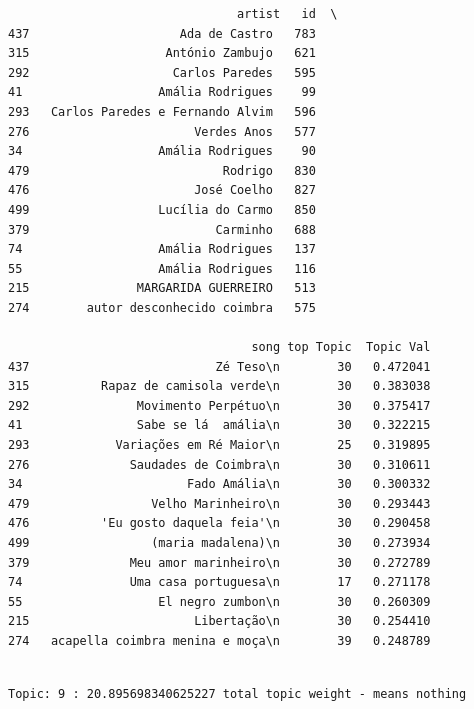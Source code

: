 \documentclass[11pt]{article}
\begin{document}
    
    \begin{verbatim}
                                artist   id  \
437                     Ada de Castro   783   
315                   António Zambujo   621   
292                    Carlos Paredes   595   
41                   Amália Rodrigues    99   
293   Carlos Paredes e Fernando Alvim   596   
276                       Verdes Anos   577   
34                   Amália Rodrigues    90   
479                           Rodrigo   830   
476                       José Coelho   827   
499                  Lucília do Carmo   850   
379                          Carminho   688   
74                   Amália Rodrigues   137   
55                   Amália Rodrigues   116   
215               MARGARIDA GUERREIRO   513   
274        autor desconhecido coimbra   575   

                                  song top Topic  Topic Val  
437                          Zé Teso\n        30   0.472041  
315          Rapaz de camisola verde\n        30   0.383038  
292               Movimento Perpétuo\n        30   0.375417  
41                Sabe se lá  amália\n        30   0.322215  
293            Variações em Ré Maior\n        25   0.319895  
276              Saudades de Coimbra\n        30   0.310611  
34                       Fado Amália\n        30   0.300332  
479                 Velho Marinheiro\n        30   0.293443  
476          'Eu gosto daquela feia'\n        30   0.290458  
499                 (maria madalena)\n        30   0.273934  
379              Meu amor marinheiro\n        30   0.272789  
74               Uma casa portuguesa\n        17   0.271178  
55                   El negro zumbon\n        30   0.260309  
215                       Libertação\n        30   0.254410  
274   acapella coimbra menina e moça\n        39   0.248789  
    \end{verbatim}

    
    \begin{Verbatim}[commandchars=\\\{\}]

Topic: 9 : 20.895698340625227 total topic weight - means nothing

    \end{Verbatim}
\end{document}
